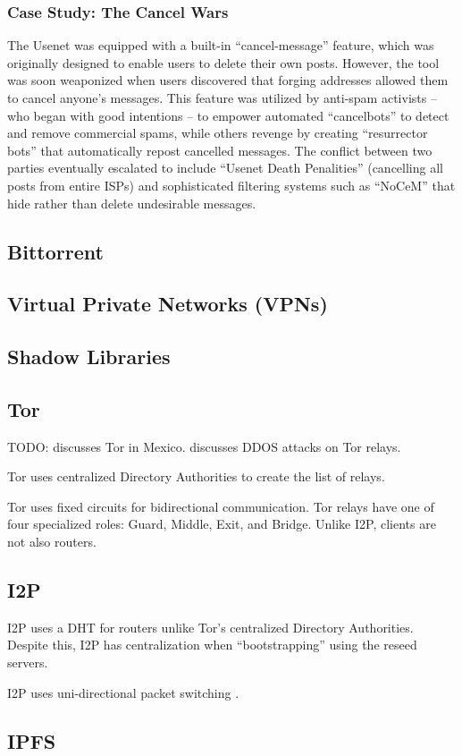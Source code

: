 \subsubsection{Case Study: The Cancel Wars}
The Usenet was equipped with a built-in ``cancel-message'' feature, which was
originally designed to enable users to delete their own posts. However, the tool
was soon weaponized when users discovered that forging addresses allowed them to
cancel anyone's messages. This feature was utilized by anti-spam activists --
who began with good intentions -- to empower automated ``cancelbots'' to detect
and remove commercial spams, while others revenge by creating ``resurrector
bots'' that automatically repost cancelled messages. The conflict between two
parties eventually escalated to include ``Usenet Death Penalities'' (cancelling
all posts from entire ISPs) and sophisticated filtering systems such as
``NoCeM'' that hide rather than delete undesirable messages.



\cite{HowUseUsenet,ohmRegulatingInternetUsenet1998}

\subsection{Bittorrent}

\subsection{Virtual Private Networks (VPNs)}

\subsection{Shadow Libraries}

\subsection{Tor}

TODO: \cite{iszaevichDistributedDetectionTor2019} discusses Tor in Mexico.
\cite{hollerCaseStudyDDoS2024} discusses DDOS attacks on Tor relays.

Tor uses centralized Directory Authorities \cite{TorProjectDirectory} to create
the list of relays.

Tor uses fixed circuits for bidirectional
communication.\cite{AnalyzingTrendsTor} Tor relays have one of four specialized
roles: Guard, Middle, Exit, and Bridge. Unlike I2P, clients are not also
routers.

\subsection{I2P}

I2P uses a DHT for routers unlike Tor's centralized Directory
Authorities.\cite{NetworkDatabaseI2P} Despite this, I2P has centralization when
``bootstrapping'' using the reseed servers.

I2P uses uni-directional packet switching \cite{I2PComparedTor}.

\subsection{IPFS}
